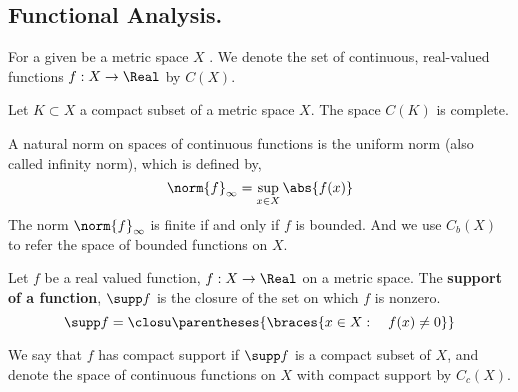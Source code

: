 \subsection{Functional Analysis.}




\begin{definition}
\end{definition}

\begin{definition}
\end{definition}

\begin{definition}
\end{definition}

\begin{definition}
\end{definition}

\begin{definition}[Continuity]
	
\end{definition}

\begin{definition}

\end{definition}
For a given be a metric space $X$ . We denote the set of continuous, real-valued functions $f:X\rightarrow \Real$ by $C(X)$.

\begin{theorem}
	Let $K\subset X$ a compact subset of a metric space $X$. The space $C(K)$ is complete.
\end{theorem}
A natural norm on spaces of continuous functions is the uniform norm (also called infinity norm), which is defined by,
\begin{equation*}
\norm{f}_{\infty}=\sup_{x\in X} \abs{f(x)}
\end{equation*}
The norm $\norm{f}_{\infty}$ is finite if and only if $f$ is bounded. And we use $C_b(X)$ to refer the space of bounded functions on $X$.

\begin{definition}
	Let $f$ be a real valued function, $f:X\rightarrow \Real$ on a metric space. The \textbf{support of a function}, $\supp f$ is the closure of the set on which $f$ is nonzero.
	\begin{equation*}
	\supp f = \closu\parentheses{{\braces{x\in X: \quad f(x)\neq 0}}}
	\end{equation*}
	
\end{definition}
We say that $f$ has compact support if $\supp f$ is a compact subset of $X$, and denote the space of continuous functions on $X$ with compact support by $C_c(X)$.

